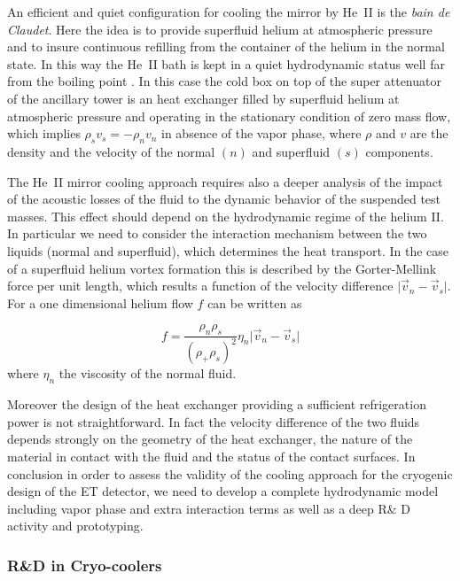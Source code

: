 An efficient and quiet configuration for cooling the mirror by He~II is the {\it bain de Claudet}. Here the idea is to provide  superfluid helium at atmospheric pressure and to insure continuous refilling from the container of the helium in the normal state. In this way the He~II bath is kept  in a quiet hydrodynamic status well far from the boiling point .
In this case the cold box on top of the super attenuator of the ancillary tower  is an  heat exchanger   filled by superfluid helium at atmospheric pressure and operating in the stationary condition of zero mass flow, which  implies $\rho_s v_s = - \rho_n v_n $ in absence of the vapor phase, where $\rho$ and $v$ are the density and the velocity of the normal $(n)$ and superfluid $(s)$ components\cite{ricci}. 
 

  The He~II mirror  cooling approach  requires also a deeper analysis of the  impact of  the acoustic losses of the fluid to the dynamic behavior of the suspended  test masses. 
This effect should depend  on the hydrodynamic regime of the  helium II. In particular  we need to consider the interaction mechanism between the two liquids (normal and superfluid), which determines the heat transport. In the case of a superfluid helium vortex formation this is  described by the Gorter-Mellink  force per unit length, which results  a function of the velocity  difference $\vert \vec v_n - \vec v_s \vert$. For a one dimensional helium flow $f$ can be written as  

\begin{equation}
f = {\frac{\rho_n \rho_s}{({\rho_ +\rho_s})^2}} \eta_n \vert \vec v_n - \vec v_s \vert
\label{eq:Gorter_Mellink}
\end{equation}  
\noindent
where $\eta_n$ the viscosity of the normal fluid. 

Moreover   the design of the heat exchanger providing a sufficient refrigeration power is not straightforward. In fact the velocity difference of the two fluids depends  strongly  on the geometry of the heat exchanger, the nature of the material in contact with the fluid  and the status of the contact surfaces. In conclusion in order to  assess  the validity of the cooling approach for the cryogenic design of the ET detector, we need  to develop a complete hydrodynamic model including   vapor phase and  extra interaction terms as well as a deep R\& D activity and prototyping.


\FloatBarrier
\subsubsection{R\&D in Cryo-coolers}
\label{cryo_infrastructure_RD}

